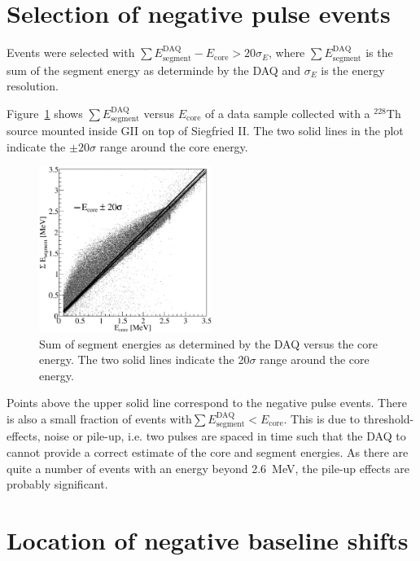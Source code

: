 \section{Selection of negative pulse events}
\label{sec:np:frac}
Events were selected with $\sum E^{\text{DAQ}}_{\text{segment}} -
E_{\text{core}} > 20\sigma_E$, where $\sum
E^{\text{DAQ}}_{\text{segment}}$ is the sum of the segment energy as
determinde by the DAQ and $\sigma_E$ is the energy resolution.

Figure~\ref{fig:np:sEnegPulse} shows $\sum
E^{\text{DAQ}}_{\text{segment}}$ versus $E_{\text{core}}$ of a data
sample collected with a $^{228}$Th source mounted inside GII on top of
Siegfried II. The two solid lines in the plot indicate the $\pm 20
\sigma$ range around the core energy.

\begin{figure}[tphb]
\centering
\includegraphics[width=0.5\textwidth]{sEnegPuls}
\caption{Sum of segment energies as determined by the DAQ versus the
core energy. The two solid lines indicate the 20$\sigma$ range around
the core energy.}
\label{fig:np:sEnegPulse}
\end{figure}

Points above the upper solid line correspond to the negative pulse
events. There is also a small fraction of events with$\sum
E^{\text{DAQ}}_{\text{segment}} < E_{\text{core}}$. This is due to
threshold-effects, noise or pile-up, i.e. two pulses are spaced in
time such that the DAQ to cannot provide a correct estimate of the
core and segment energies. As there are quite a number of events with
an energy beyond 2.6~MeV, the pile-up effects are probably
significant.

\section{Location of negative baseline shifts}
\label{sec:np:locneg}


